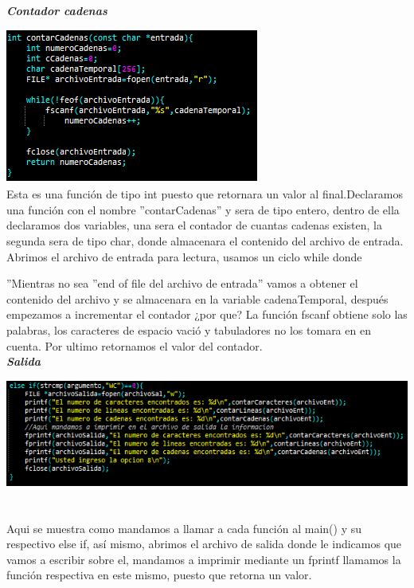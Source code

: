 \documentclass[12pt,letterpaper]{report}
\begin{document}
\textbf{\textit{\em{Contador cadenas}}}
\begin{multicols}{2}
\includegraphics[scale=0.7]{punto8-3}\\
Esta es una función de tipo int puesto que retornara un valor al final.Declaramos una función con el nombre ''contarCadenas'' y sera de tipo entero, dentro de ella declaramos dos variables, una sera el contador de cuantas cadenas existen, la segunda sera de tipo char, donde almacenara el contenido del archivo de entrada. Abrimos el archivo de entrada para lectura, usamos un ciclo while donde 
\end{multicols}
''Mientras no sea ''end of file del archivo de entrada'' vamos a obtener el contenido del archivo y se almacenara en la variable cadenaTemporal, después empezamos a incrementar el contador ¿por que? La función fscanf obtiene solo las palabras, los caracteres de espacio vació y tabuladores no los tomara en en cuenta.
Por ultimo retornamos el valor del contador.\\

\textbf{\textit{\em{Salida}}}
\begin{multicols}{2}

\includegraphics[scale=0.5]{punto8-imprimir}\\\\
\\Aqui se muestra como mandamos a llamar a cada función al main() y su respectivo else if, así mismo, abrimos el archivo de salida donde le indicamos que vamos a escribir sobre el, mandamos a imprimir mediante un fprintf llamamos la función respectiva en este mismo, puesto que retorna un valor.
\end{multicols}
\end{document}
